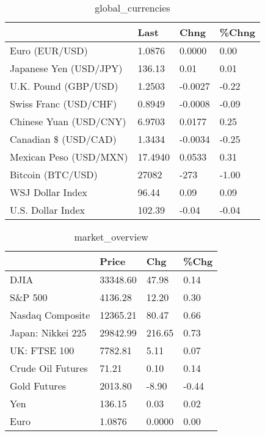 \documentclass{article}%
\begin{document}
%


\begin{table}[htbp]%
\caption{global\_currencies}%
\centering%
\begin{adjustbox}{width=1\textwidth}%
\begin{tabular}{llll}
\toprule
                       &    Last &    Chng & \%Chng \\
\midrule
        Euro (EUR/USD) &  1.0876 &  0.0000 &  0.00 \\
Japanese Yen (USD/JPY) &  136.13 &    0.01 &  0.01 \\
  U.K. Pound (GBP/USD) &  1.2503 & -0.0027 & -0.22 \\
 Swiss Franc (USD/CHF) &  0.8949 & -0.0008 & -0.09 \\
Chinese Yuan (USD/CNY) &  6.9703 &  0.0177 &  0.25 \\
  Canadian \$ (USD/CAD) &  1.3434 & -0.0034 & -0.25 \\
Mexican Peso (USD/MXN) & 17.4940 &  0.0533 &  0.31 \\
     Bitcoin (BTC/USD) &   27082 &    -273 & -1.00 \\
      WSJ Dollar Index &   96.44 &    0.09 &  0.09 \\
     U.S. Dollar Index &  102.39 &   -0.04 & -0.04 \\
\bottomrule
\end{tabular}
%
\end{adjustbox}%
\end{table}

%


\begin{table}[htbp]%
\caption{market\_overview}%
\centering%
\begin{adjustbox}{width=1\textwidth}%
\begin{tabular}{llll}
\toprule
                  &    Price &    Chg &  \%Chg \\
\midrule
             DJIA & 33348.60 &  47.98 &  0.14 \\
          S\&P 500 &  4136.28 &  12.20 &  0.30 \\
 Nasdaq Composite & 12365.21 &  80.47 &  0.66 \\
Japan: Nikkei 225 & 29842.99 & 216.65 &  0.73 \\
     UK: FTSE 100 &  7782.81 &   5.11 &  0.07 \\
Crude Oil Futures &    71.21 &   0.10 &  0.14 \\
     Gold Futures &  2013.80 &  -8.90 & -0.44 \\
              Yen &   136.15 &   0.03 &  0.02 \\
             Euro &   1.0876 & 0.0000 &  0.00 \\
\bottomrule
\end{tabular}
%
\end{adjustbox}%
\end{table}

%
\end{document}
